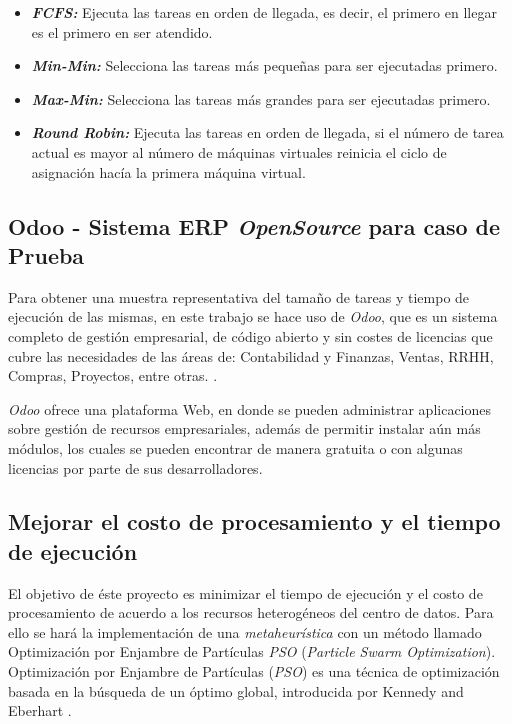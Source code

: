 \documentclass[jou,apacite]{apa6}
\begin{document}
\begin{itemize}
	\item \textit{\textbf{FCFS:}} Ejecuta las tareas en orden de llegada, es decir, el primero en llegar es el primero en ser atendido.
	\item \textit{\textbf{Min-Min:}} Selecciona las tareas m\'as pequeñas para ser ejecutadas primero.
	\item  \textit{\textbf{Max-Min:}} Selecciona las tareas m\'as grandes para ser ejecutadas primero.
	\item \textit{\textbf{Round Robin:}} Ejecuta las tareas en orden de llegada, si el número de tarea actual es mayor al número de máquinas virtuales reinicia el ciclo de asignación hacía la primera máquina virtual.
\end{itemize}

\subsection{Odoo - Sistema ERP \textit{OpenSource} para caso de Prueba}

Para obtener una muestra representativa del tamaño de tareas y tiempo de ejecución de las mismas, en este trabajo se hace uso de \textit{Odoo}, que es un sistema completo de gestión empresarial, de código abierto y sin costes de licencias que cubre las necesidades de las áreas de: Contabilidad y Finanzas, Ventas, RRHH, Compras, Proyectos, entre otras. \cite{odooWiki}.

\textit{Odoo} ofrece una plataforma Web, en donde se pueden administrar aplicaciones sobre gestión de recursos empresariales, además de permitir instalar aún más módulos, los cuales se pueden encontrar de manera gratuita o con algunas licencias por parte de sus desarrolladores.

\subsection{Mejorar el costo de procesamiento y el tiempo de ejecución}

El objetivo de éste proyecto es minimizar el tiempo de ejecución y el costo de procesamiento de acuerdo a los recursos heterogéneos del centro de datos. Para ello se hará la  implementación de una \textit{metaheurística} con un método llamado Optimización por Enjambre de Partículas \textit{PSO} (\textit{Particle Swarm Optimization}).\\

Optimización por Enjambre de Partículas (\textit{PSO}) es una técnica de optimización basada en la búsqueda de un óptimo global, introducida por Kennedy and Eberhart \cite{pandey2010}. 
\end{document}

